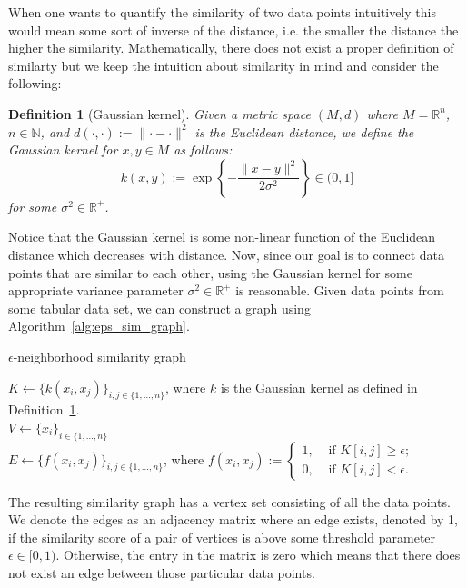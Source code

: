 \documentclass[paper=a4,fontsize=11pt,DIV=8,BCOR=5mm,twoside,pdftex,bibtotocnumbered]{scrreprt}
\newcommand{\R}{{\mathbb R}}
\newcommand{\N}{{\mathbb N}}
\theoremstyle{plain}
\newtheorem{definition}[proposition]{Definition}
\begin{document}
When one wants to quantify the similarity of two data points intuitively this would mean some sort of inverse of the distance, i.e. the smaller the distance the higher the similarity. Mathematically, there does not exist a proper definition of similarty but we keep the intuition about similarity in mind and consider the following:

\begin{definition}[Gaussian kernel]\label{def:Gaussian_kernel}
	Given a metric space $(M,d)$ where $M=\R^n$, $n\in\N$, and $d(\cdot, \cdot):= \lVert \cdot - \cdot \lVert^2$ is the Euclidean distance, we define the \emph{Gaussian kernel} for $x,y\in M$ as follows:
	\[
		k(x,y) := \exp\left\{-\frac{\lVert x-y \rVert^2}{2\sigma^2}\right\} \in (0,1]
	\]
	for some $\sigma^2 \in \R^+$.
\end{definition} 

Notice that the Gaussian kernel is some non-linear function of the Euclidean distance which decreases with distance. Now, since our goal is to connect data points that are similar to each other, using the Gaussian kernel for some appropriate variance parameter $\sigma^2\in\R^+$ is reasonable. Given data points from some tabular data set, we can construct a graph using Algorithm~\ref{alg:eps_sim_graph}.

\begin{algorithm}
	\caption{$\epsilon$-neighborhood similarity graph}\label{alg:eps_sim_graph}
	\KwIn{$\{x_i\}_{i \in \{1,\dots, n\}}$, $n\in\N$ data points; $\epsilon\in[0,1)$ and $\sigma^2\in\R^+$ parameters}
	$K \gets \{k(x_i, x_j)\}_{i,j \in\{1,\dots, n\}}$, where $k$ is the Gaussian kernel as defined in Definition~\ref{def:Gaussian_kernel}.\\
	$V \gets \{x_i\}_{i \in \{1,\dots, n\}}$\\
	$E \gets \{f(x_i, x_j)\}_{i,j \in\{1,\dots, n\}}$, where $f(x_i, x_j):=
	\begin{cases}
	1, & \text{ if } K[i,j] \ge \epsilon;\\
	0, & \text{ if } K[i,j] < \epsilon.
	\end{cases}$
\end{algorithm}

The resulting similarity graph has a vertex set consisting of all the data points. We denote the edges as an adjacency matrix where an edge exists, denoted by 1, if the similarity score of a pair of vertices is above some threshold parameter $\epsilon\in[0,1)$. Otherwise, the entry in the matrix is zero which means that there does not exist an edge between those particular data points. 
\end{document}
